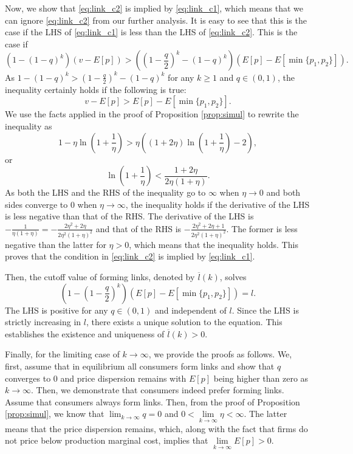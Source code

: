 \documentclass[12pt]{article}
\begin{document}
Now, we show that \eqref{eq:link_c2} is implied 
by \eqref{eq:link_c1}, which means that we can ignore \eqref{eq:link_c2} from 
our further analysis.  It is easy to see that this is the case if the LHS of 
\eqref{eq:link_c1} is less than the LHS of \eqref{eq:link_c2}.  This is the 
case if
\begin{equation*}
\left(1 - \left(1-q\right)^k\right)(v-E[p]) > \left(\left(1 - 
\frac{q}{2}\right)^k- (1-q)^k\right)(E[p]-E[\min\{p_1,p_2\}]). 
\end{equation*}
As $1 - \left(1-q\right)^k> \left(1 - 
\frac{q}{2}\right)^k- (1-q)^k$ for any $k\geq 1$ and $q \in (0,1)$, the 
inequality certainly holds if the following is true:
\begin{equation*}
v- E[p] > E[p]-E[\min\{p_1,p_2\}].
\end{equation*}
We use the facts applied in the proof of Proposition \ref{prop:simul} to 
rewrite the inequality as
\begin{equation*}
1 - \eta \ln\left(1 + \frac{1}{\eta}\right) > \eta\left((1+2\eta)\ln\left(1 + 
\frac{1}{\eta}\right)-2\right), 
\end{equation*}
or
\begin{equation*}
\ln\left(1 + \frac{1}{\eta}\right)< \frac{1+2\eta}{2\eta(1+\eta)}.
\end{equation*}
As both the LHS and the RHS of the inequality go to $\infty$ when $\eta \to 0$ 
and both sides converge to $0$ when $\eta \to \infty$, the inequality holds if 
the derivative of the LHS is less negative than that of the RHS.  The 
derivative of the LHS is $-\frac{1}{\eta(1+\eta)} = - 
\frac{2\eta^2+2\eta}{2\eta^2(1+\eta)^2}$ and that of the RHS is $- 
\frac{2\eta^2 + 2\eta +1}{2\eta^2(1+\eta)^2}$.  The former is less negative 
than the latter for $\eta >0$, which means that the inequality holds.  This 
proves that the condition in \eqref{eq:link_c2} is implied by 
\eqref{eq:link_c1}.

Then, the cutoff value of forming links, denoted by $\overline{l}(k)$, solves 
\begin{equation*}
\left(1 - \left(1 - \frac{q}{2}\right)^k\right)(E[p]-E[\min\{p_1,p_2\}]) =l.
\end{equation*}
The LHS is positive for any $q \in (0,1)$ and independent of $l$.  Since the 
LHS is strictly increasing in $l$, there exists a unique solution to the 
equation.  This establishes the existence and uniqueness of 
$\overline{l}(k)>0$.  


Finally, for the limiting case of $k \to \infty$, we provide the proofs as 
follows.  We, first, assume that in equilibrium all consumers form links and 
show that $q$ converges to $0$ and price dispersion remains  with $E[p]$ being 
higher than zero as $k \to \infty$.  Then, we demonstrate that consumers indeed 
prefer forming links.  Assume that consumers always form links.  Then, from the 
proof of Proposition \ref{prop:simul}, we know that $\lim_{k \to \infty}q=0$ 
and $0<\lim\limits_{k 
\to \infty} \eta<\infty$.  The latter means that the price dispersion remains, 
which, along with the fact that firms do not price below production marginal 
cost, implies that $\lim\limits_{k \to\infty}E[p]>0$. 
\end{document}
